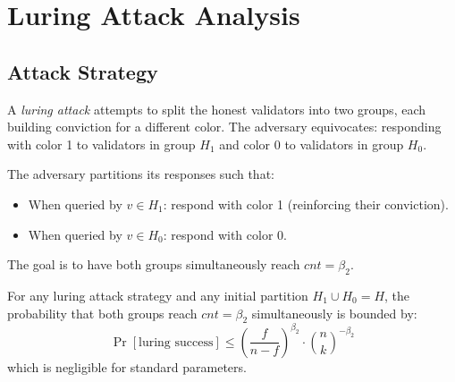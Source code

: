 \section{Luring Attack Analysis}

\label{sec:attacks}

\subsection{Attack Strategy}

A \emph{luring attack} attempts to split the honest validators into two groups, each
building conviction for a different color. The adversary equivocates: responding with
color 1 to validators in group $H_1$ and color 0 to validators in group $H_0$.

\begin{definition}
The adversary partitions its responses such that:
\begin{itemize}[nosep]
\item When queried by $v \in H_1$: respond with color 1 (reinforcing their conviction).
\item When queried by $v \in H_0$: respond with color 0.
\end{itemize}
The goal is to have both groups simultaneously reach $cnt = \beta_2$.
\end{definition}

\begin{theorem}
\label{thm:luring}
For any luring attack strategy and any initial partition $H_1 \cup H_0 = H$, the
probability that both groups reach $cnt = \beta_2$ simultaneously is bounded by:
\[
\Pr[\text{luring success}] \leq \left(\frac{f}{n - f}\right)^{\beta_2} \cdot \binom{n}{k}^{-\beta_2}
\]
which is negligible for standard parameters.
\end{theorem}

